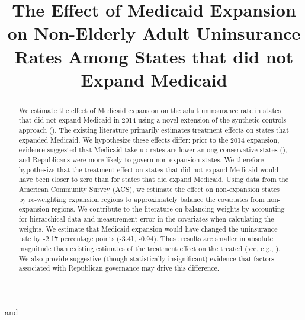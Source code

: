 \documentclass[aoas]{imsart}
\theoremstyle{plain}
\theoremstyle{remark}
\begin{document}
\begin{frontmatter}
\title{The Effect of Medicaid Expansion on Non-Elderly Adult Uninsurance Rates Among States that did not Expand Medicaid}
\runtitle{}

\begin{aug}
\author[A]{ } and
\author[A]{ }
\address[A]{Carnegie Mellon University, }

\end{aug}

\begin{abstract}
We estimate the effect of Medicaid expansion on the adult uninsurance rate in states that did not expand Medicaid in 2014 using a novel extension of the synthetic controls approach (\cite{abadie2010synthetic}). The existing literature primarily estimates treatment effects on states that expanded Medicaid. We hypothesize these effects differ: prior to the 2014 expansion, evidence suggested that Medicaid take-up rates are lower among conservative states (\cite{sommers2012understanding}), and Republicans were more likely to govern non-expansion states. We therefore hypothesize that the treatment effect on states that did not expand Medicaid would have been closer to zero than for states that did expand Medicaid. Using data from the American Community Survey (ACS), we estimate the effect on non-expansion states by re-weighting expansion regions to approximately balance the covariates from non-expansion regions. We contribute to the literature on balancing weights by accounting for hierarchical data and measurement error in the covariates when calculating the weights. We estimate that Medicaid expansion would have changed the uninsurance rate by -2.17 percentage points (-3.41, -0.94). These results are smaller in absolute magnitude than existing estimates of the treatment effect on the treated (see, e.g., \cite{courtemanche2017early}). We also provide suggestive (though statistically insignificant) evidence that factors associated with Republican governance may drive this difference.
\end{abstract}


\end{frontmatter}
\end{document}

